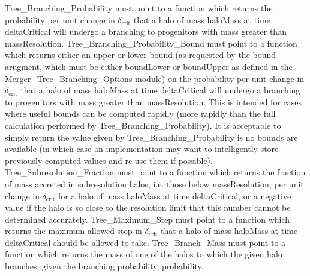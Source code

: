 {\normalfont \ttfamily Tree\_Branching\_Probability} must point to a function which returns the probability per unit change in $\delta_\mathrm{crit}$ that a halo of mass {\normalfont \ttfamily haloMass} at time {\normalfont \ttfamily deltaCritical} will undergo a branching to progenitors with mass greater than {\normalfont \ttfamily massResolution}. {\normalfont \ttfamily Tree\_Branching\_Probability\_Bound} must point to a function which returns either an upper or lower bound (as requested by the {\normalfont \ttfamily bound} arugment, which must be either {\normalfont \ttfamily boundLower} or {\normalfont \ttfamily boundUpper} as defined in the {\normalfont \ttfamily Merger\_Tree\_Branching\_Options} module) on the probability per unit change in $\delta_\mathrm{crit}$ that a halo of mass {\normalfont \ttfamily haloMass} at time {\normalfont \ttfamily deltaCritical} will undergo a branching to progenitors with mass greater than {\normalfont \ttfamily massResolution}. This is intended for cases where useful bounds can be computed rapidly (more rapidly than the full calculation performed by {\normalfont \ttfamily Tree\_Branching\_Probability}). It is acceptable to simply return the value given by {\normalfont \ttfamily Tree\_Branching\_Probability} is no bounds are available (in which case an implementation may want to intelligently store previously computed values and re-use them if possible). {\normalfont \ttfamily Tree\_Subresolution\_Fraction} must point to a function which returns the fraction of mass accreted in subresolution halos, i.e. those below {\normalfont \ttfamily massResolution}, per unit change in $\delta_\mathrm{crit}$ for a halo of mass {\normalfont \ttfamily haloMass} at time {\normalfont \ttfamily deltaCritical}, or a negative value if the halo is so close to the resolution limit that this number cannot be determined accurately. {\normalfont \ttfamily Tree\_Maximum\_Step} must point to a function which returns the maximum allowed step in $\delta_\mathrm{crit}$ that a halo of mass {\normalfont \ttfamily haloMass} at time {\normalfont \ttfamily deltaCritical} should be allowed to take. {\normalfont \ttfamily Tree\_Branch\_Mass} must point to a function which returns the mass of one of the halos to which the given halo branches, given the branching 
probability, {\normalfont \ttfamily probability}.

